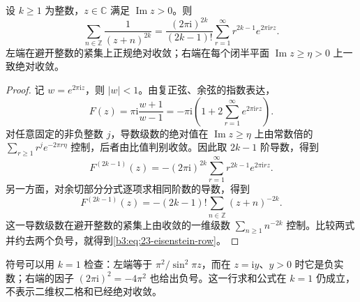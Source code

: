 \begin{lemma}[一行格点的指数展开]\label{b3:lem:23-eisenstein-row}
设 \(k\ge1\) 为整数，\(z\in\mathbb C\) 满足 \(\operatorname{Im}z>0\)。则
\begin{equation}\label{b3:eq:23-eisenstein-row}
 \sum_{n\in\mathbb Z}\frac1{(z+n)^{2k}}
 =\frac{(2\pi\mathrm{i})^{2k}}{(2k-1)!}
 \sum_{r=1}^{\infty}r^{2k-1}e^{2\pi\mathrm{i}rz}.
\end{equation}
左端在避开整数的紧集上正规绝对收敛；右端在每个闭半平面 \(\operatorname{Im}z\ge\eta>0\) 上一致绝对收敛。
\end{lemma}
\begin{proof}
记 \(w=e^{2\pi\mathrm{i}z}\)，则 \(|w|<1\)。由复正弦、余弦的指数表达，
\[
 F(z)=\pi\mathrm{i}\frac{w+1}{w-1}
 =-\pi\mathrm{i}\left(1+2\sum_{r=1}^{\infty}e^{2\pi\mathrm{i}rz}\right).
\]
对任意固定的非负整数 \(j\)，导数级数的绝对值在 \(\operatorname{Im}z\ge\eta\) 上由常数倍的 \(\sum_{r\ge1}r^j e^{-2\pi r\eta}\) 控制，后者由比值判别收敛。因此取 \(2k-1\) 阶导数，得到
\[
 F^{(2k-1)}(z)
 =-(2\pi\mathrm{i})^{2k}\sum_{r=1}^{\infty}r^{2k-1}e^{2\pi\mathrm{i}rz}.
\]
另一方面，对余切部分分式逐项求相同阶数的导数，得到
\[
 F^{(2k-1)}(z)=-(2k-1)!
 \sum_{n\in\mathbb Z}(z+n)^{-2k}.
\]
这一导数级数在避开整数的紧集上由收敛的一维级数 \(\sum_{n\ge1}n^{-2k}\) 控制。比较两式并约去两个负号，就得到\eqref{b3:eq:23-eisenstein-row}。
\end{proof}

符号可以用 \(k=1\) 检查：左端等于 \(\pi^2/\sin^2\pi z\)，而在 \(z=\mathrm{i}y\)、\(y>0\) 时它是负实数；右端的因子 \((2\pi\mathrm{i})^2=-4\pi^2\) 也给出负号。这一行求和公式在 \(k=1\) 仍成立，不表示二维权二格和已经绝对收敛。

